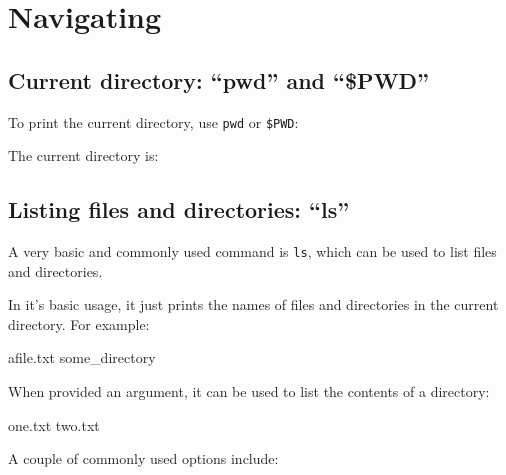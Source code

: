 \chapter{Navigating}

\section{Current directory: ``pwd'' and ``\$PWD''}

To print the current directory, use \verb|pwd| or \verb|$PWD|:

\begin{prompt}
The current directory is: %
\end{prompt}

\section{Listing files and directories: ``ls''}

A very basic and commonly used command is \verb|ls|, which can be used to list files and directories.

In it's basic usage, it just prints the names of files and directories in the current directory. For example:

\begin{prompt}
afile.txt   some_directory
\end{prompt}

When provided an argument, it can be used to list the contents of a directory:

\begin{prompt}
one.txt  two.txt
\end{prompt}

A couple of commonly used options include:

